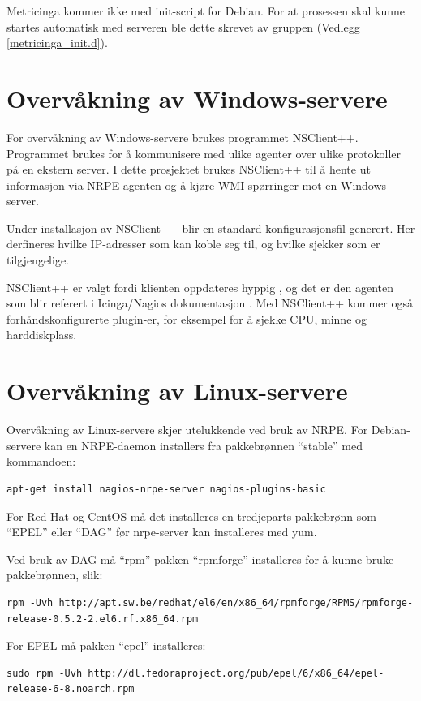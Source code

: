 Metricinga kommer ikke med init-script for Debian. For at prosessen skal kunne startes automatisk med serveren ble dette skrevet av gruppen (Vedlegg \ref{metricinga_init.d}).
\section{Overvåkning av Windows-servere}
For overvåkning av Windows-servere brukes programmet NSClient++\cite{nsclientmain}. Programmet brukes for å kommunisere med ulike agenter over ulike protokoller på en ekstern server. I dette prosjektet brukes NSClient++ til å hente ut informasjon via NRPE-agenten og å kjøre WMI-spørringer mot en Windows-server. 

Under installasjon av NSClient++ blir en standard konfigurasjonsfil generert. Her derfineres hvilke IP-adresser som kan koble seg til, og hvilke sjekker som er tilgjengelige.

NSClient++ er valgt fordi klienten oppdateres hyppig \cite{nsclient}, og det er den agenten som blir referert i Icinga/Nagios dokumentasjon \cite{icingawin}. Med NSClient++ kommer også forhåndskonfigurerte plugin-er, for eksempel for å sjekke CPU, minne og harddiskplass.

\section{Overvåkning av Linux-servere}\label{sec:overvaklinux}
Overvåkning av Linux-servere skjer utelukkende ved bruk av NRPE. For Debian-servere kan en NRPE-daemon installers fra pakkebrønnen ``stable'' med kommandoen:
\begin{lstlisting}[style=example]
apt-get install nagios-nrpe-server nagios-plugins-basic
\end{lstlisting}

For Red Hat og CentOS må det installeres en tredjeparts pakkebrønn som ``EPEL'' eller ``DAG'' før nrpe-server kan installeres med yum.

Ved bruk av DAG må ``rpm''-pakken ``rpmforge'' installeres for å kunne bruke pakkebrønnen, slik:
\begin{lstlisting}[style=example]
rpm -Uvh http://apt.sw.be/redhat/el6/en/x86_64/rpmforge/RPMS/rpmforge-release-0.5.2-2.el6.rf.x86_64.rpm
\end{lstlisting}

For EPEL må pakken ``epel'' installeres:
\begin{lstlisting}[style=example]
sudo rpm -Uvh http://dl.fedoraproject.org/pub/epel/6/x86_64/epel-release-6-8.noarch.rpm
\end{lstlisting}


